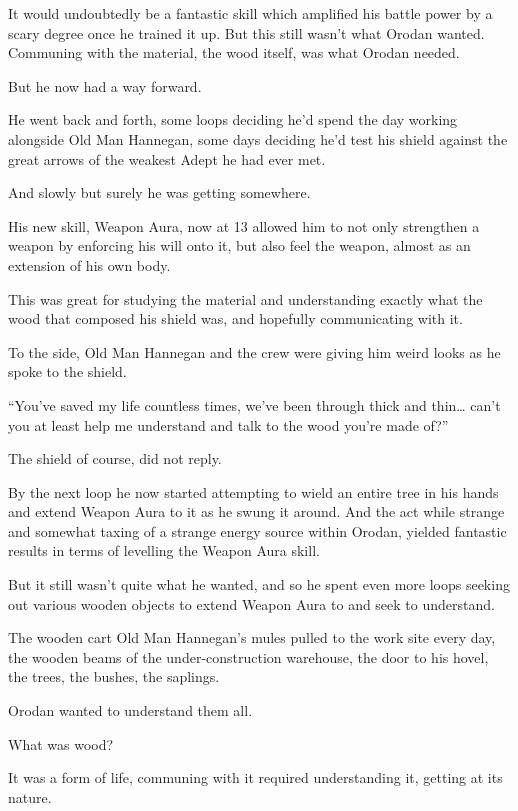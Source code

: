 \documentclass[a4paper,10pt]{book}
\begin{document}
It would undoubtedly be a fantastic skill which amplified his battle power by a scary degree once he trained it up. But this still wasn’t what Orodan wanted. Communing with the material, the wood itself, was what Orodan needed.\par
But he now had a way forward.\par
He went back and forth, some loops deciding he’d spend the day working alongside Old Man Hannegan, some days deciding he’d test his shield against the great arrows of the weakest Adept he had ever met.\par
And slowly but surely he was getting somewhere.\par
\par
His new skill, Weapon Aura, now at 13 allowed him to not only strengthen a weapon by enforcing his will onto it, but also feel the weapon, almost as an extension of his own body.\par
This was great for studying the material and understanding exactly what the wood that composed his shield was, and hopefully communicating with it.\par
To the side, Old Man Hannegan and the crew were giving him weird looks as he spoke to the shield.\par
“You’ve saved my life countless times, we’ve been through thick and thin… can’t you at least help me understand and talk to the wood you’re made of?”\par
The shield of course, did not reply.\par
By the next loop he now started attempting to wield an entire tree in his hands and extend Weapon Aura to it as he swung it around. And the act while strange and somewhat taxing of a strange energy source within Orodan, yielded fantastic results in terms of levelling the Weapon Aura skill.\par
But it still wasn’t quite what he wanted, and so he spent even more loops seeking out various wooden objects to extend Weapon Aura to and seek to understand.\par
The wooden cart Old Man Hannegan’s mules pulled to the work site every day, the wooden beams of the under-construction warehouse, the door to his hovel, the trees, the bushes, the saplings.\par
Orodan wanted to understand them all.\par
What was wood?\par
It was a form of life, communing with it required understanding it, getting at its nature.\par
\end{document}
